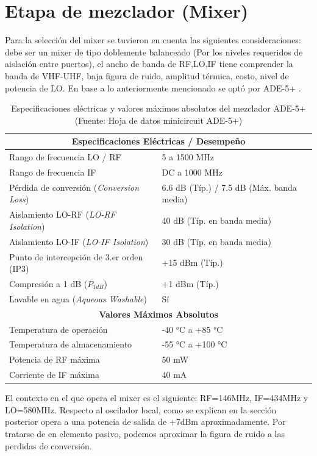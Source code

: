 \documentclass[11pt,a4paper,twoside]{report}
\begin{document}
	\section{Etapa de mezclador (Mixer)}
	Para la selección del mixer se tuvieron en cuenta las siguientes consideraciones: debe ser un mixer de tipo doblemente balanceado (Por los niveles requeridos de aislación entre puertos), el ancho de banda de RF,LO,IF tiene comprender la banda de VHF-UHF, baja figura de ruido, amplitud térmica, costo, nivel de potencia de LO. En base a lo anteriormente mencionado se optó por ADE-5+ .\newline
	\begin{table}[htbp]
		\centering
		\label{tab:ade5_caracteristicas}
		\begin{tabular}{|l|l|}
			\hline
			\multicolumn{2}{|c|}{\textbf{Especificaciones Eléctricas / Desempeño}} \\
			\hline
			Rango de frecuencia LO / RF & 5 a 1500 MHz \\
			Rango de frecuencia IF & DC a 1000 MHz \\
			Pérdida de conversión (\textit{Conversion Loss}) & 6.6 dB (Típ.) / 7.5 dB (Máx. banda media) \\
			Aislamiento LO-RF (\textit{LO-RF Isolation}) & 40 dB (Típ. en banda media) \\
			Aislamiento LO-IF (\textit{LO-IF Isolation}) & 30 dB (Típ. en banda media) \\
			Punto de intercepción de 3.er orden (IP3) & +15 dBm (Típ.) \\
			Compresión a 1 dB ($P_{1dB}$) & +1 dBm (Típ.) \\
			Lavable en agua (\textit{Aqueous Washable}) & Sí \\
			\hline
			\multicolumn{2}{|c|}{\textbf{Valores Máximos Absolutos}} \\
			\hline
			Temperatura de operación & -40 °C a +85 °C \\
			Temperatura de almacenamiento & -55 °C a +100 °C \\
			Potencia de RF máxima & 50 mW \\
			Corriente de IF máxima & 40 mA \\
			\hline
		\end{tabular}
		\caption{Especificaciones eléctricas y valores máximos absolutos del mezclador ADE-5+ (Fuente: Hoja de datos minicircuit ADE-5+)}
	\end{table}
	
	El contexto en el que opera el mixer es el siguiente: RF=146MHz, IF=434MHz y LO=580MHz. Respecto al oscilador local, como se explican en la sección posterior opera a una potencia de salida de +7dBm aproximadamente. Por tratarse de en elemento pasivo, podemos aproximar la figura de ruido a las perdidas de conversión.
	
\end{document}
